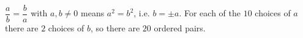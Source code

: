 $\dfrac {a}{b}=\dfrac {b}{a}$ with $a,b\ne0$ means $a^2=b^2$, i.e. $b=\pm a$. For each of the $10$ choices of $a$ there are $2$ choices of $b$, so there are $\boxed{20}$ ordered pairs.
